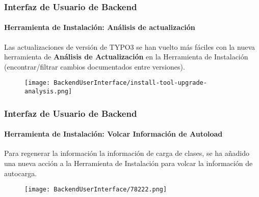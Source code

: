 \begin{frame}[fragile]
	\frametitle{Interfaz de Usuario de Backend}
	\framesubtitle{Herramienta de Instalación: Análisis de actualización}


	Las actualizaciones de versión de TYPO3 se han vuelto más fáciles con la nueva herramienta de
	\textbf{Análisis de Actualización} en la Herramienta de Instalación (encontrar/filtrar cambios documentados entre versiones).

	\begin{figure}
		\texttt{[image: BackendUserInterface/install-tool-upgrade-analysis.png]}
	\end{figure}

\end{frame}


\begin{frame}[fragile]
	\frametitle{Interfaz de Usuario de Backend}
	\framesubtitle{Herramienta de Instalación: Volcar Información de Autoload}

	Para regenerar la información la información de carga de clases, se ha añadido una nueva acción a la Herramienta de Instalación para volcar la información de autocarga.

	\begin{figure}
		\texttt{[image: BackendUserInterface/78222.png]}
	\end{figure}

\end{frame}

